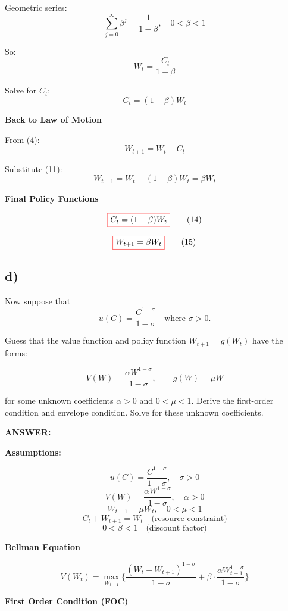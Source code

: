 \documentclass[12pt]{article}
\begin{document}
Geometric series:  
\[
\sum_{j=0}^\infty \beta^j = \frac{1}{1-\beta}, 
\quad 0<\beta<1 
\tag{9}
\]

So:  
\[
W_t = \frac{C_t}{1-\beta} \tag{10}
\]

Solve for \( C_t \):  
\[
C_t = (1-\beta) W_t \tag{11}
\]


\textbf{Back to Law of Motion}  

From (4):  
\[
W_{t+1} = W_t - C_t \tag{12}
\]

Substitute (11):  
\[
W_{t+1} = W_t - (1-\beta) W_t 
= \beta W_t 
\tag{13}
\]


\textbf{Final Policy Functions}  

\[
\fcolorbox{red}{white}{$
C_t = (1-\beta) W_t
$} \tag{14}
\]

\[
\fcolorbox{red}{white}{$
W_{t+1} = \beta W_t
$} \tag{15}
\]

\subsection*{\textbf{d)}}

Now suppose that 
\[
u(C) = \frac{C^{1-\sigma}}{1-\sigma} \quad \text{where } \sigma > 0.
\]  

Guess that the value function and policy function \( W_{t+1} = g(W_t) \) have the forms:  

\[
V(W) = \frac{\alpha W^{1-\sigma}}{1-\sigma}, 
\qquad 
g(W) = \mu W
\]

for some unknown coefficients \( \alpha > 0 \) and \( 0 < \mu < 1 \).  
Derive the first-order condition and envelope condition. Solve for these unknown coefficients.

\vspace{0.5em}
\noindent\textcolor{formalred}{\textbf{ANSWER:}}

\textbf{Assumptions:}

\[
u(C) = \frac{C^{1-\sigma}}{1-\sigma}, \quad \sigma > 0
\]
\[
V(W) = \frac{\alpha W^{1-\sigma}}{1-\sigma}, \quad \alpha > 0
\]
\[
W_{t+1} = \mu W_t, \quad 0 < \mu < 1
\]
\[
C_t + W_{t+1} = W_t \quad \text{(resource constraint)}
\]
\[
0 < \beta < 1 \quad \text{(discount factor)}
\]


\textbf{Bellman Equation}

\[
V(W_t) = \max_{W_{t+1}} \Bigg\{ \frac{(W_t - W_{t+1})^{1-\sigma}}{1-\sigma} + \beta \cdot \frac{\alpha W_{t+1}^{1-\sigma}}{1-\sigma} \Bigg\} \tag{1}
\]

\textbf{First Order Condition (FOC)}
\end{document}
